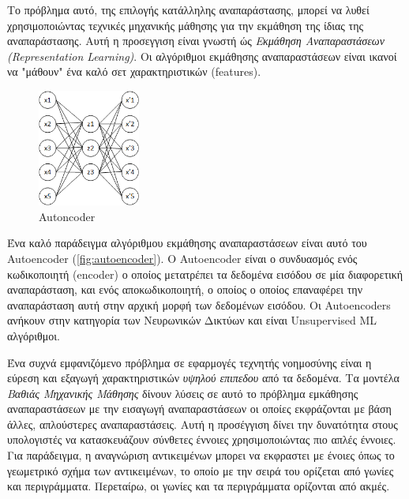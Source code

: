 Το πρόβλημα αυτό, της επιλογής κατάλληλης αναπαράστασης, μπορεί να λυθεί
χρησιμοποιώντας τεχνικές μηχανικής μάθησης για την εκμάθηση της ίδιας
της αναπαράστασης. Αυτή η προσεγγιση είναι γνωστή ώς
\emph{Εκμάθηση Αναπαραστάσεων (Representation Learning)}. Οι αλγόριθμοι
εκμάθησης αναπαραστάσεων είναι ικανοί να "μάθουν" ένα καλό σετ χαρακτηριστικών (features).
\begin{figure}[!ht]
  \centering
  \includegraphics[width=0.3\textwidth]{./images/chapter3/autoencoder.png}
  \caption[Autoncoder]{Autoncoder}
  \label{fig:autoencoder}
\end{figure}
Ένα καλό παράδειγμα αλγόριθμου εκμάθησης αναπαραστάσεων είναι αυτό του
Autoencoder \cite{baldi2012autoencoders} (\autoref{fig:autoencoder}).
Ο Autoencoder είναι ο συνδυασμός ενός κωδικοποιητή (encoder) ο οποίος μετατρέπει
τα δεδομένα εισόδου σε μία διαφορετική αναπαράσταση, και ενός αποκωδικοποιητή,
ο οποίος ο οποίος επαναφέρει την αναπαράσταση αυτή στην αρχική μορφή των
δεδομένων εισόδου. Οι Autoencoders ανήκουν στην κατηγορία των Νευρωνικών
Δικτύων και είναι Unsupervised ML αλγόριθμοι.

Ένα συχνά εμφανιζόμενο πρόβλημα σε εφαρμογές τεχνητής νοημοσύνης είναι
η εύρεση και εξαγωγή χαρακτηριστικών \emph{υψηλού επιπεδου} από τα
δεδομένα. Τα μοντέλα \emph{Βαθιάς Μηχανικής Μάθησης} δίνουν λύσεις
σε αυτό το πρόβλημα εμκάθησης αναπαραστάσεων με την εισαγωγή αναπαραστάσεων
οι οποίες εκφράζονται με βάση άλλες, απλούστερες αναπαραστάσεις. Αυτή η
προσέγγιση δίνει την δυνατότητα στους υπολογιστές να κατασκευάζουν σύνθετες
έννοιες χρησιμοποιώντας πιο απλές έννοιες. Για παράδειγμα, η αναγνώριση αντικειμένων
μπορει να εκφραστει με ένοιες όπως το γεωμετρικό σχήμα των αντικειμένων,
το οποίο με την σειρά του ορίζεται από γωνίες και περιγράμματα. Περεταίρω,
οι γωνίες και τα περιγράμματα ορίζονται από ακμές.

